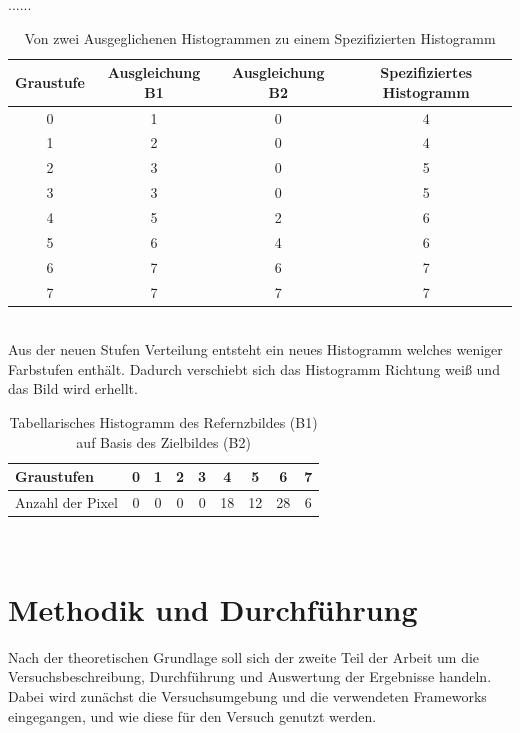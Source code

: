 \documentclass[a4paper,12pt,oneside]{article}
\begin{document}
......\\
\begin{table}
[h]
\caption{Von zwei Ausgeglichenen Histogrammen zu einem Spezifizierten Histogramm}
\centering
\begin{tabular}{|c|c|c|c|}
\hline
Graustufe & Ausgleichung B1 & Ausgleichung B2 & Spezifiziertes Histogramm\\
\hline
0 & 1 & 0 & 4\\
\hline
1 & 2 & 0 & 4\\
\hline
2 & 3 & 0 & 5\\
\hline
3 & 3 & 0 & 5\\
\hline
4 & 5 & 2 & 6\\
\hline
5 & 6 & 4 & 6\\
\hline
6 & 7 & 6 & 7\\
\hline
7 & 7 & 7 & 7\\
\hline
\end{tabular}
\end{table}\\
Aus der neuen Stufen Verteilung entsteht ein neues Histogramm welches weniger Farbstufen enthält. Dadurch verschiebt sich das Histogramm Richtung weiß und das Bild wird erhellt.
\begin{table}
[h]
\caption{Tabellarisches Histogramm des Refernzbildes (B1) auf Basis des Zielbildes (B2)}
\centering
\begin{tabular}{|l|c|c|c|c|c|c|c|c|}
\hline
Graustufen & 0 & 1 & 2 & 3 & 4 & 5 & 6 & 7\\
\hline
Anzahl der Pixel & 0 & 0 & 0 & 0 & 18 & 12 & 28 & 6\\
\hline
\end{tabular}
\end{table}\\
\newpage
  \section{Methodik und Durchführung}\label{s.methudurchf}
Nach der theoretischen Grundlage soll sich der zweite Teil der Arbeit um die Versuchsbeschreibung, Durchführung und Auswertung der Ergebnisse handeln. Dabei wird zunächst die Versuchsumgebung und die verwendeten Frameworks eingegangen, und wie diese für den Versuch genutzt werden.
\end{document}
